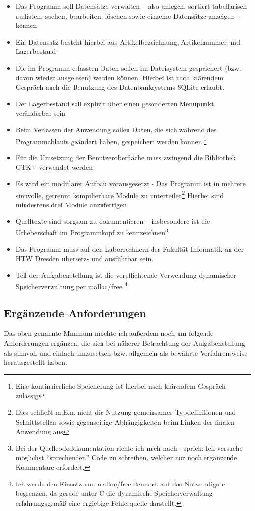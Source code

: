\begin{itemize}
\item Das Programm soll Datensätze verwalten -- also anlegen, sortiert tabellarisch auflisten, suchen, bearbeiten,
löschen sowie einzelne Datensätze anzeigen -- können
\item Ein Datensatz besteht hierbei aus Artikelbezeichnung, Artikelnummer und Lagerbestand
\item Die im Programm erfassten Daten sollen im Dateisystem gespeichert (bzw. davon wieder ausgelesen) werden können.
Hierbei ist nach klärendem Gespräch auch die Benutzung des Datenbanksystems SQLite erlaubt.
\item Der Lagerbestand soll explizit über einen gesonderten Menüpunkt veränderbar sein
\item Beim Verlassen der Anwendung sollen Daten, die sich während des Programmablaufs geändert haben,
gespeichert werden können.\footnote{Eine kontinuierliche Speicherung ist hierbei nach klärendem Gespräch
zulässig}
\item Für die Umsetzung der Benutzeroberfläche muss zwingend die Bibliothek GTK+ verwendet werden
\item Es wird ein modularer Aufbau vorausgesetzt - Das Programm ist in mehrere sinnvolle, getrennt kompilierbare Module
zu unterteilen\footnote{Dies schließt m.E.n. nicht die Nutzung gemeinsamer Typdefinitionen und Schnittstellen sowie
gegenseitige Abhängigkeiten beim Linken der finalen Anwendung aus}
Hierbei sind mindestens drei Module anzufertigen
\item Quelltexte sind sorgsam zu dokumentieren -- insbesondere ist die Urheberschaft im Programmkopf zu
kennzeichnen\footnote{Bei der Quellcodedokumentation richte ich mich nach \cite[Kap.4]{Martin:CleanCode} - sprich:
Ich versuche möglichst ``sprechenden'' Code zu schreiben, welcher nur noch ergänzende Kommentare erfordert.}
\item Das Programm muss auf den Laborrechnern der Fakultät Informatik an der HTW Dresden übersetz- und ausführbar sein.
\item Teil der Aufgabenstellung ist die verpflichtende Verwendung dynamischer Speicherverwaltung per malloc/free
\footnote{Ich werde den Einsatz von malloc/free dennoch auf das Notwendigste begrenzen, da gerade unter C die dynamische
Speicherverwaltung erfahrungsgemäß eine ergiebige Fehlerquelle darstellt.}
\end{itemize}

\subsection{Ergänzende Anforderungen}
Das oben genannte Minimum möchte ich außerdem noch um folgende Anforderungen ergänzen, die sich bei näherer Betrachtung
der Aufgabenstellung als sinnvoll und einfach umzusetzen bzw. allgemein als bewährte Verfahrensweise herausgestellt
haben.

